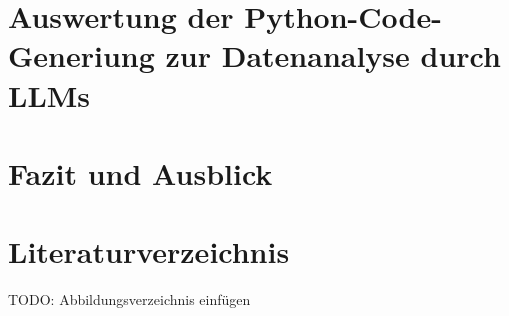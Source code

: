 \documentclass[11pt,a4paper]{article}
\begin{document}
\section{Auswertung der Python-Code-Generiung zur Datenanalyse durch LLMs}
\label{sec:auswertung}

\section{Fazit und Ausblick}
\label{sec:fazit}

\newpage
\section{Literaturverzeichnis}
\label{sec:anhang}
\printbibliography
TODO: Abbildungsverzeichnis einfügen
\end{document}
